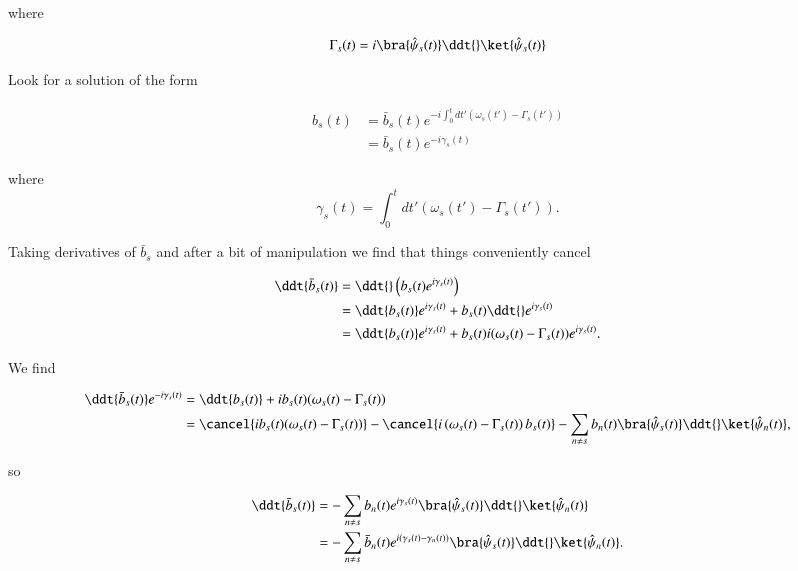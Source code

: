 where

\begin{equation}\label{eqn:qmTwoL9:70}
\Gamma_s(t) =
i \bra{\hat{\psi}_s(t)} \ddt{} \ket{\hat{\psi}_s(t)} 
\end{equation}

Look for a solution of the form

\begin{equation}\label{eqn:qmTwoL9:90}
\begin{aligned}
b_s(t) &= \bar{b}_s(t) e^{-i \int_0^t dt' (\omega_s(t') - \Gamma_s(t'))} \\
&= 
\bar{b}_s(t) e^{-i \gamma_s(t)}
\end{aligned}
\end{equation}

where
\begin{equation}\label{eqn:qmTwoL9:110}
\gamma_s(t) = 
\int_0^t dt' (\omega_s(t') - \Gamma_s(t')).
\end{equation}

Taking derivatives of $\bar{b}_s$ and after a bit of manipulation we find that things conveniently cancel

\begin{align*}
\ddt{\bar{b}_s(t)} 
&= \ddt{} \left( b_s(t) e^{i \gamma_s(t) } \right) \\
&= 
\ddt{b_s(t)} e^{i \gamma_s(t) } +
b_s(t) \ddt{} e^{i \gamma_s(t) }  \\
&= 
\ddt{b_s(t)} e^{i \gamma_s(t) } +
b_s(t) i (\omega_s(t) - \Gamma_s(t)) e^{i \gamma_s(t) }.
\end{align*}

We find

\begin{align*}
\ddt{\bar{b}_s(t)} 
e^{-i \gamma_s(t)} 
&= 
\ddt{b_s(t)} + i b_s(t) (\omega_s(t) - \Gamma_s(t))  \\
&=
\cancel{i b_s(t) (\omega_s(t) - \Gamma_s(t)) }
-\cancel{i \left( 
\omega_s(t) - \Gamma_s(t)
\right) b_s(t)}
- 
\sum_{n \ne s} b_n(t) 
\bra{\hat{\psi}_s(t)}
\ddt{} \ket{\hat{\psi}_n(t)},
\end{align*}

so

\begin{align*}
\ddt{\bar{b}_s(t)} 
&=
- 
\sum_{n \ne s} b_n(t) 
e^{i \gamma_s(t)} 
\bra{\hat{\psi}_s(t)}
\ddt{} \ket{\hat{\psi}_n(t)} \\
&=
- 
\sum_{n \ne s} \bar{b}_n(t) 
e^{i (\gamma_s(t) - \gamma_n(t))} 
\bra{\hat{\psi}_s(t)}
\ddt{} \ket{\hat{\psi}_n(t)}.
\end{align*}

